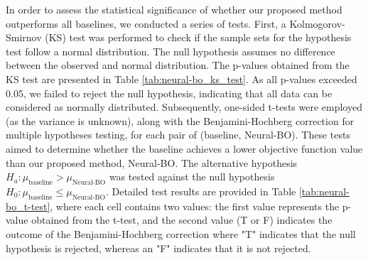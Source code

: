 In order to assess the statistical significance of whether our proposed method outperforms all baselines, we conducted a series of tests. First, a Kolmogorov-Smirnov (KS) test was performed to check if the sample sets for the hypothesis test follow a normal distribution. The null hypothesis assumes no difference between the observed and normal distribution. The p-values obtained from the KS test are presented in Table \ref{tab:neural-bo_ks_test}.  As all p-values exceeded 0.05, we failed to reject the null hypothesis, indicating that all data can be considered as normally distributed. Subsequently, one-sided t-tests were employed (as the variance is unknown), along with the Benjamini-Hochberg correction for multiple hypotheses testing, for each pair of (baseline, Neural-BO). These tests aimed to determine whether the baseline achieves a lower objective function value than our proposed method, Neural-BO. The alternative hypothesis $H_a: \mu_\text{baseline} > \mu_{\text{Neural-BO}}$ was tested against the null hypothesis $H_0: \mu_\text{baseline} \le \mu_{\text{Neural-BO}}$. Detailed test results are provided in Table \ref{tab:neural-bo_t-test}, where each cell contains two values: the first value represents the p-value obtained from the t-test, and the second value (T or F) indicates the outcome of the Benjamini-Hochberg correction where "T" indicates that the null hypothesis is rejected, whereas an "F" indicates that it is not rejected.


